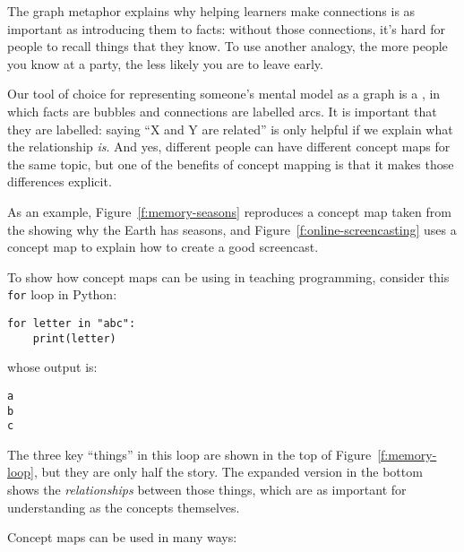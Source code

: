 
The graph metaphor explains why helping learners make connections is as
important as introducing them to facts: without those connections, it's
hard for people to recall things that they know. To use another analogy,
the more people you know at a party, the less likely you are to leave
early.

Our tool of choice for representing someone's mental model as a graph is
a , in which facts are bubbles
and connections are labelled arcs. It is important that they are
labelled: saying ``X and Y are related'' is only helpful if we explain
what the relationship \emph{is}. And yes, different people can have different
concept maps for the same topic, but one of the benefits of concept
mapping is that it makes those differences explicit.

As an example, Figure~\ref{f:memory-seasons} reproduces a concept map
taken from the  showing why the
Earth has seasons, and Figure~\ref{f:online-screencasting} uses a concept
map to explain how to create a good screencast.


To show how concept maps can be using in teaching programming, consider
this \texttt{for} loop in Python:

\begin{verbatim}
for letter in "abc":
    print(letter)
\end{verbatim}

whose output is:

\begin{verbatim}
a
b
c
\end{verbatim}

The three key ``things'' in this loop are shown in the top of
Figure~\ref{f:memory-loop}, but they are only half the story. The
expanded version in the bottom shows the \emph{relationships} between those
things, which are as important for understanding as the concepts
themselves.


Concept maps can be used in many ways:

